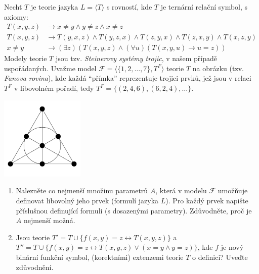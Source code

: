 \documentclass[a4paper]{amsart}
\theoremstyle{definition}
\begin{document}
                \medskip\begin{ukol}[2 body]
                    Nechť $T$ je teorie jazyka $L=\langle T \rangle$ s rovností, kde $T$ je ternární relační symbol, s axiomy:
                    \begin{align*}
                        T(x,y,z)&\to x\ne y \wedge y\ne z \wedge x\ne z \\
                        T(x,y,z)&\to T(y,x,z)\wedge T(y,z,x)\wedge T(z,y,x)\wedge T(z,x,y)\wedge T(x,z,y)\\
                        x\ne y &\to (\exists z)(T(x,y,z)\wedge(\forall u)(T(x,y,u)\to u=z))
                    \end{align*}
                    Modely teorie $T$ jsou tzv. \emph{Steinerovy systémy trojic}, v našem případě uspořádaných. Uvažme model $\mathcal{F}=\langle \{1,2,\dots,7\},T^F\rangle$ teorie $T$ na obrázku (tzv. \emph{Fanova rovina}), kde každá ``přímka'' reprezentuje trojici prvků, jež jsou v relaci $T^F$ v libovolném pořadí, tedy $T^F=\{(2,4,6),(6,2,4),\dots\}$.
                    \begin{center}
                        \includegraphics[height=4cm]{files/fano.png}  
                    \end{center}
                    \begin{enumerate}        
                        \item Nalezněte co nejmenší množinu parametrů $A$, která v modelu $\mathcal{F}$ umožňuje definovat libovolný jeho prvek (formulí jazyka $L$). Pro každý prvek napište příslušnou definující formuli (s dosazenými parametry). Zdůvodněte, proč je $A$ nejmenší možná.
                        \item Jsou teorie $T'=T \cup \{f(x,y)=z \leftrightarrow T(x,y,z)\}$ a $T''=T\cup \{f(x,y)=z \leftrightarrow T(x,y,z) \vee (x=y \wedge y=z)\}$, kde $f$ je nový binární funkční symbol, (korektními) extenzemi teorie $T$ o definici? Uveďte zdůvodnění.
                    \end{enumerate} 
                \end{ukol}
\end{document}
